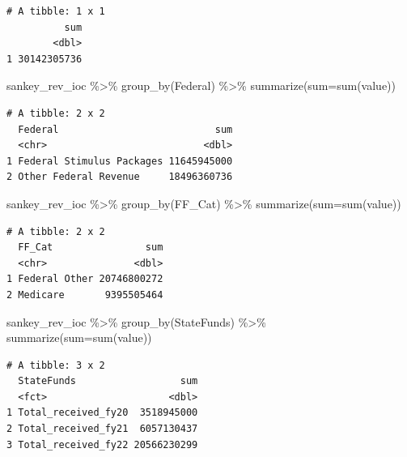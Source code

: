 \documentclass[
  letterpaper,
  DIV=11,
  numbers=noendperiod]{scrreport}
\newenvironment{Shaded}{\begin{snugshade}}{\end{snugshade}}
\newcommand{\AttributeTok}[1]{\textcolor[rgb]{0.40,0.45,0.13}{#1}}
\newcommand{\FunctionTok}[1]{\textcolor[rgb]{0.28,0.35,0.67}{#1}}
\newcommand{\NormalTok}[1]{\textcolor[rgb]{0.00,0.23,0.31}{#1}}
\newcommand{\SpecialCharTok}[1]{\textcolor[rgb]{0.37,0.37,0.37}{#1}}
\begin{document}
\begin{verbatim}
# A tibble: 1 x 1
          sum
        <dbl>
1 30142305736
\end{verbatim}

\begin{Shaded}
\begin{Highlighting}[]
\NormalTok{sankey\_rev\_ioc }\SpecialCharTok{\%\textgreater{}\%} \FunctionTok{group\_by}\NormalTok{(Federal) }\SpecialCharTok{\%\textgreater{}\%} 
  \FunctionTok{summarize}\NormalTok{(}\AttributeTok{sum=}\FunctionTok{sum}\NormalTok{(value))}
\end{Highlighting}
\end{Shaded}

\begin{verbatim}
# A tibble: 2 x 2
  Federal                           sum
  <chr>                           <dbl>
1 Federal Stimulus Packages 11645945000
2 Other Federal Revenue     18496360736
\end{verbatim}

\begin{Shaded}
\begin{Highlighting}[]
\NormalTok{sankey\_rev\_ioc }\SpecialCharTok{\%\textgreater{}\%} \FunctionTok{group\_by}\NormalTok{(FF\_Cat) }\SpecialCharTok{\%\textgreater{}\%} 
  \FunctionTok{summarize}\NormalTok{(}\AttributeTok{sum=}\FunctionTok{sum}\NormalTok{(value))}
\end{Highlighting}
\end{Shaded}

\begin{verbatim}
# A tibble: 2 x 2
  FF_Cat                sum
  <chr>               <dbl>
1 Federal Other 20746800272
2 Medicare       9395505464
\end{verbatim}

\begin{Shaded}
\begin{Highlighting}[]
\NormalTok{sankey\_rev\_ioc }\SpecialCharTok{\%\textgreater{}\%} \FunctionTok{group\_by}\NormalTok{(StateFunds) }\SpecialCharTok{\%\textgreater{}\%} 
  \FunctionTok{summarize}\NormalTok{(}\AttributeTok{sum=}\FunctionTok{sum}\NormalTok{(value))}
\end{Highlighting}
\end{Shaded}

\begin{verbatim}
# A tibble: 3 x 2
  StateFunds                  sum
  <fct>                     <dbl>
1 Total_received_fy20  3518945000
2 Total_received_fy21  6057130437
3 Total_received_fy22 20566230299
\end{verbatim}
\end{document}
